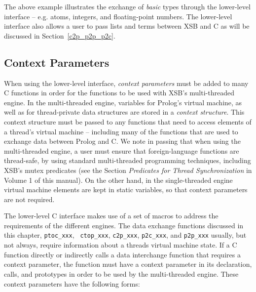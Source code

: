 The above example illustrates the exchange of {\em basic} types
through the lower-level interface -- e.g. atoms, integers, and
floating-point numbers.  The lower-level interface also allows a user
to pass lists and terms between XSB and C as will be discussed in
Section~\ref{c2p_p2p_p2c}.

\subsection{Context Parameters} \label{sec:context-parameter}

When using the lower-level interface, {\em context parameters} must be
added to many C functions in order for the functions to be used with
XSB's multi-threaded engine.  In the multi-threaded engine, variables
for Prolog's virtual machine, as well as for thread-private data
structures are stored in a {\em context structure}.  This context
structure must be passed to any functions that need to access elements
of a thread's virtual machine -- including many of the functions that
are used to exchange data between Prolog and C.  We note in passing
that when using the multi-threaded engine, a user must ensure that
foreign-language functions are thread-safe, by using standard
multi-threaded programming techniques, including XSB's mutex
predicates (see the Section {\em Predicates for Thread
  Synchronization} in Volume 1 of this manual).  On the other hand, in
the single-threaded engine virtual machine elements are kept in static
variables, so that context parameters are not required.

The lower-level C interface makes use of a set of macros to address
the requirements of the different engines.  The data exchange
functions discussed in this chapter, {\tt ptoc\_xxx}, {\tt
  ctop\_xxx}, {\tt c2p\_xxx}, {\tt p2c\_xxx},
and {\tt p2p\_xxx} usually, but not always, require
information about a threads virtual machine state.  
%
%
If a C function directly or indirectly calls a data interchange
function that requires a context parameter, the function must have a
context parameter in its declaration, calls, and prototypes in order
to be used by the multi-threaded engine.  These context parameters
have the following forms:

